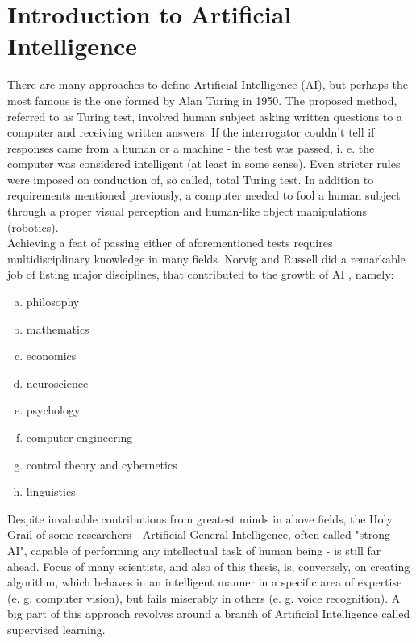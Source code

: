 \documentclass[11pt]{article}
\begin{document}
\section{Introduction to Artificial Intelligence} \label{introduction_to_ai}
There are many approaches to define Artificial Intelligence (AI), but perhaps the most famous is the one formed by Alan Turing in 1950. The proposed method, referred to as Turing test, involved human subject asking written questions to a computer and receiving written answers. If the interrogator couldn't tell if responses came from a human or a machine - the test was passed, i. e. the computer was considered intelligent (at least in some sense). Even stricter rules were imposed on conduction of, so called, total Turing test. In addition to requirements mentioned previously, a computer needed to fool a human subject through a proper visual perception and human-like object manipulations (robotics).\\

Achieving a feat of passing either of aforementioned tests requires multidisciplinary knowledge in many fields. Norvig and Russell did a remarkable job of listing major disciplines, that contributed to the growth of AI \cite{ai_modern_approach}, namely:
\begin{enumerate}[a)]
\item philosophy
\item mathematics
\item economics
\item neuroscience
\item psychology
\item computer engineering
\item control theory and cybernetics
\item linguistics
\end{enumerate}
Despite invaluable contributions from greatest minds in above fields, the Holy Grail of some researchers - Artificial General Intelligence, often called "strong AI", capable of performing any intellectual task of human being - is still far ahead. Focus of many scientists, and also of this thesis, is, conversely, on creating algorithm, which behaves in an intelligent manner in a specific area of expertise (e. g. computer vision), but fails miserably in others (e. g. voice recognition). A big part of this approach revolves around a branch of Artificial Intelligence called supervised learning. \\
\end{document}
